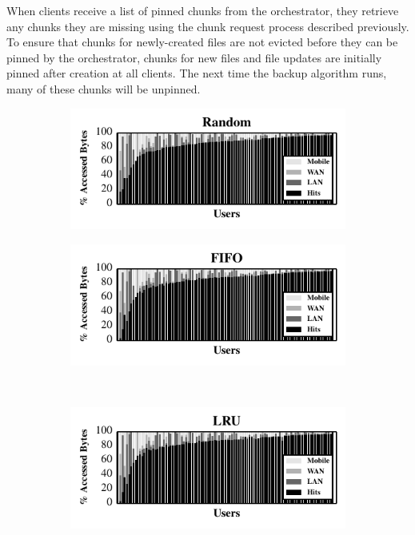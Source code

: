When clients receive a list of pinned chunks from the orchestrator, they
retrieve any chunks they are missing using the chunk request process
described previously. To ensure that chunks for newly-created files are not
evicted before they can be pinned by the orchestrator, chunks for new files
and file updates are initially pinned after creation at all clients. The next
time the backup algorithm runs, many of these chunks will be unpinned.
\begin{figure}[t]

  \begin{subfigure}[t]{0.5\columnwidth}

    \includegraphics[width=\columnwidth]{./figures/pocketlocker/RandomSimulatorPerformanceGraph.pdf}

  \end{subfigure}%
  \begin{subfigure}[t]{0.5\columnwidth}

    \includegraphics[width=\columnwidth]{./figures/pocketlocker/FIFOSimulatorPerformanceGraph.pdf}

  \end{subfigure}\\
  \begin{subfigure}[t]{0.5\columnwidth}

    \includegraphics[width=\columnwidth]{./figures/pocketlocker/LRUSimulatorPerformanceGraph.pdf}


\end{subfigure}
\end{figure}
